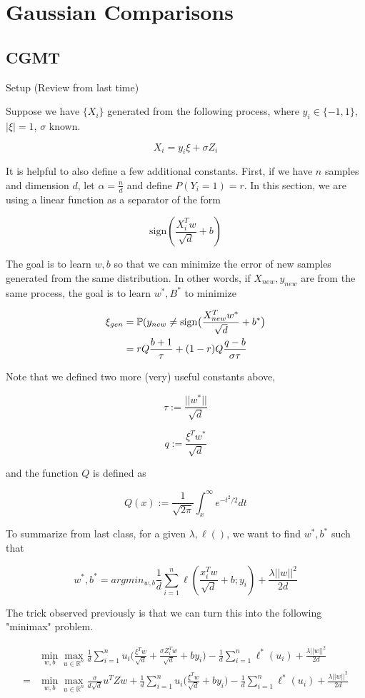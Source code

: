 \chapter{Gaussian Comparisons}


\section{CGMT}

Setup (Review from last time)

Suppose we have $\{X_i\}$ generated from the following process, where $y_i \in \{-1, 1\}$, $|\xi| = 1$, $\sigma$ known.

$$X_i = y_i \xi + \sigma Z_i$$

It is helpful to also define a few additional constants. First, if we have $n$ samples and dimension $d$, let $\alpha = \frac{n}{d}$ and define $P(Y_i = 1) = r$. In this section, we are using a linear function as a separator of the form 


$$\text{sign}(\frac{X_i^Tw}{\sqrt{d}} + b)$$

The goal is to learn $w, b$ so that we can minimize the error of new samples generated from the same distribution. In other words, if $X_{new}, y_{new}$ are from the same process, the goal is to learn $w^*, B^*$ to minimize

\begin{align*}
    \xi_{gen} &= \P(y_{new} \ne \text{sign}\big(\frac{X_{new}^Tw^*}{\sqrt{d}} + b^*\big) \\
    &= rQ\frac{b+1}{\tau} + (1-r)Q\frac{q-b}{\sigma \tau}
\end{align*}

Note that we defined two more (very) useful constants above, 

$$\tau := \frac{||w^*||}{\sqrt{d}}$$

$$q := \frac{\xi^Tw^*}{\sqrt{d}}$$

and the function $Q$ is defined as 

$$Q(x) := \frac{1}{\sqrt{2\pi}}\int_{x}^\infty e^{-t^2/2}dt$$

To summarize from last class, for a given $\lambda, \ell()$, we want to find $w^*, b^*$ such that


$$w^*, b^* = argmin_{w,b} \frac{1}{d}\sum_{i=1}^n \ell(\frac{x_i^Tw}{\sqrt{d}} + b; y_i) + \frac{\lambda ||w||^2}{2d}$$

The trick observed previously is that we can turn this into the following "minimax" problem.


\begin{align*}
    &\min_{w,b} \max_{u \in \mathbb{R}^n} \frac{1}{d}\sum_{i=1}^n u_i\Big(\frac{\xi^Tw}{\sqrt{d}} + \frac{\sigma Z_i^T w}{\sqrt{d}} + by_i\Big) - \frac{1}{d}\sum_{i=1}^n \ell^*(u_i) + \frac{\lambda||w||^2}{2d} \\
    = &\min_{w,b} \max_{u \in \mathbb{R}^n} \frac{\sigma}{d\sqrt{d}} u^TZw + \frac{1}{d}\sum_{i=1}^n u_i\Big(\frac{\xi^Tw}{\sqrt{d}} + by_i\Big)- \frac{1}{d}\sum_{i=1}^n \ell^*(u_i) + \frac{\lambda||w||^2}{2d}
\end{align*}


